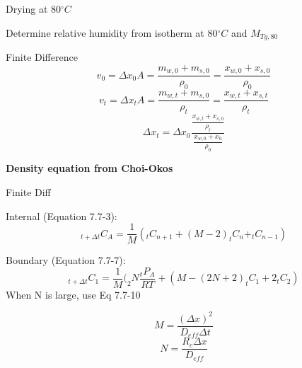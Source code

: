 \documentclass[11pt]{article}
\newcommand{\degree}{\ensuremath{^\circ}}
\begin{document}
Drying at $80\degree C$

Determine relative humidity from isotherm at $80\degree C$ and $M_{Tg,80}$

Finite Difference
\[v_0 = \Delta x_0 A = \frac{m_{w,0}+m_{s,0}}{\rho_0} = \frac{x_{w,0}+x_{s,0}}{\rho_0}\]
\[v_t = \Delta x_t A = \frac{m_{w,t}+m_{s,0}}{\rho_t} = \frac{x_{w,t}+x_{s,t}}{\rho_t}\]
\[\Delta x_t = \Delta x_0 \frac{\frac{x_{w,t}+x_{s,0}}{\rho_t}}{\frac{x_{w,0}+x_0}{\rho_0}}\]

\textbf{Density equation from Choi-Okos}

Finite Diff

Internal (Equation 7.7-3):
\[_{t+\Delta t}C_A = \frac{1}{M}(_tC_{n+1}+(M-2)_tC_n + _tC_{n-1}) \]

Boundary (Equation 7.7-7):
\[_{t+\Delta t}C_1 = \frac{1}{M}(_2N\frac{_tP_A}{RT}+(M-(2N+2)_tC_1 + 2_tC_2) \]
When N is large, use Eq 7.7-10

\[M = \frac{(\Delta x)^2}{D_{eff}\Delta t}\]
\[N = \frac{R_c\Delta x}{D_{eff}}\]
\end{document}
